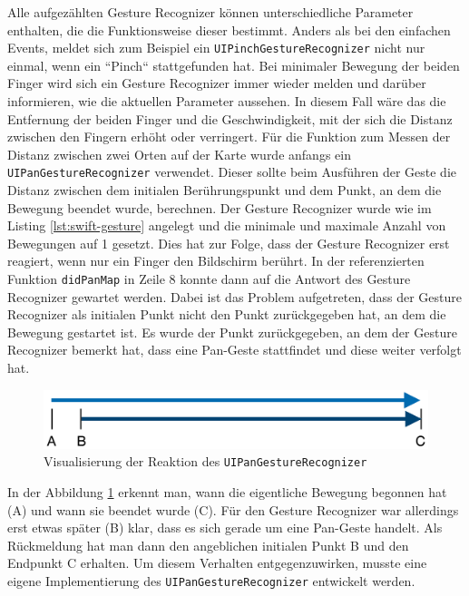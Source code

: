 Alle aufgezählten Gesture Recognizer können unterschiedliche Parameter enthalten, die die Funktionsweise dieser bestimmt.
Anders als bei den einfachen Events, meldet sich zum Beispiel ein \texttt{UIPinchGestureRecognizer} nicht nur einmal, wenn ein ``Pinch`` stattgefunden hat.
Bei minimaler Bewegung der beiden Finger wird sich ein Gesture Recognizer immer wieder melden und darüber informieren, wie die aktuellen Parameter aussehen.
In diesem Fall wäre das die Entfernung der beiden Finger und die Geschwindigkeit, mit der sich die Distanz zwischen den Fingern erhöht oder verringert.\pbreak%
%
Für die Funktion zum Messen der Distanz zwischen zwei Orten auf der Karte wurde anfangs ein \texttt{UIPanGestureRecognizer} verwendet.
Dieser sollte beim Ausführen der Geste die Distanz zwischen dem initialen Berührungspunkt und dem Punkt, an dem die Bewegung beendet wurde, berechnen.
Der Gesture Recognizer wurde wie im Listing \ref{lst:swift-gesture} angelegt und die minimale und maximale Anzahl von Bewegungen auf 1 gesetzt.
Dies hat zur Folge, dass der Gesture Recognizer erst reagiert, wenn nur ein Finger den Bildschirm berührt.
In der referenzierten Funktion \texttt{didPanMap} in Zeile 8 konnte dann auf die Antwort des Gesture Recognizer gewartet werden.\pbreak%
%
Dabei ist das Problem aufgetreten, dass der Gesture Recognizer als initialen Punkt nicht den Punkt zurückgegeben hat, an dem die Bewegung gestartet ist.
Es wurde der Punkt zurückgegeben, an dem der Gesture Recognizer bemerkt hat, dass eine Pan-Geste stattfindet und diese weiter verfolgt hat.
\begin{figure}[h]
	\centering
	\includegraphics[scale=0.25]{images/pangesture.png}
	\caption{Visualisierung der Reaktion des \texttt{UIPanGestureRecognizer}}
	\label{fig:pangesture}
\end{figure}
In der Abbildung \ref{fig:pangesture} erkennt man, wann die eigentliche Bewegung begonnen hat (A) und wann sie beendet wurde (C).
Für den Gesture Recognizer war allerdings erst etwas später (B) klar, dass es sich gerade um eine Pan-Geste handelt.
Als Rückmeldung hat man dann den angeblichen initialen Punkt B und den Endpunkt C erhalten.
Um diesem Verhalten entgegenzuwirken, musste eine eigene Implementierung des \texttt{UIPanGestureRecognizer} entwickelt werden.
